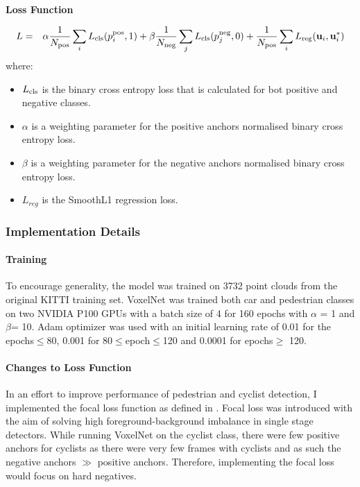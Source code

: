 \noindent
\textbf{Loss Function} 

\begin{eqnarray}
	 L & = & \alpha\frac{1}{N_{\text{\scriptsize pos}}} \sum\limits_{i} L_{\text{\scriptsize cls}}(p^{\text{\scriptsize pos}}_i, 1) + 
	\beta\frac{1}{N_{\text{\scriptsize neg}}} \sum\limits_{j} L_{\text{\scriptsize cls}}(p^{\text{\scriptsize neg}}_j, 0) \nonumber  + \frac{1}{N_{\text{\scriptsize pos}}} \sum\limits_{i} L_{\text{\scriptsize reg}}(\mathbf{u}_i, \mathbf{u}_i^*)	
	\label{eqn}
\end{eqnarray}
where:
\begin{itemize}[noitemsep]
	\item $L_{\text{\scriptsize cls}}$ is the binary cross entropy loss that is calculated for bot positive and negative classes. 
	\item $\alpha$ is a weighting parameter for the positive anchors normalised binary cross entropy loss. 
	\item $\beta$ is a weighting parameter for the negative anchors normalised binary cross entropy loss.
	\item $L_{reg}$ is the SmoothL1 regression loss.
\end{itemize}

\subsubsection{Implementation Details}
\paragraph{Training} 
To encourage generality, the model was trained on 3732 point clouds from the original KITTI training set.
VoxelNet was trained both car and pedestrian classes on two NVIDIA P100 GPUs with a batch size of 4 for 160 epochs  with $\alpha$ = 1 and  $\beta$= 10. Adam optimizer was used with an initial learning rate of 0.01 for the epochs$\le$80, 0.001 for 80$\le$epoch$\le$120 and 0.0001 for epochs$\ge$ 120. 


\paragraph{Changes to Loss Function }
In an effort to improve performance of pedestrian and cyclist detection, I implemented the focal loss function as defined in \cite{lin2018focal}. Focal loss was introduced with the aim of solving high foreground-background imbalance in single stage detectors. While running VoxelNet on the cyclist class, there were few positive anchors for cyclists as there were very few frames with cyclists and as such the negative anchors $\gg$ positive anchors. Therefore, implementing the focal loss would focus on hard negatives.

